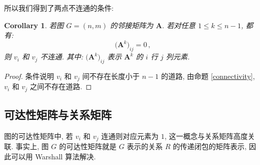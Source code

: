 \documentclass[UTF8]{ctexart}
\theoremstyle{mystyle}
\theoremstyle{myremark}
\theoremstyle{plain}
\newtheorem{corollary}{Corollary}[section]
\newcommand{\ve}[1]{\boldsymbol{\mathbf{#1}}}
\begin{document}
所以我们得到了两点不连通的条件:
\begin{corollary}
    若图 $ G = (n, m) $ 的邻接矩阵为 $ \ve A $. 若对任意 $ 1 \leqslant k \leqslant n - 1 $, 都有:
    \[ 
        \bigl( \ve A^k \bigr)_{ij} = 0 \,,
    \]
    则 $ v_i $ 和 $ v_j $ 不连通. 其中: $ \bigl( \ve A^k \bigr)_{ij} $ 表示 $ \ve A^k $ 的 $ i $ 行 $ j $ 列元素.
\end{corollary}

\begin{proof}
    条件说明 $ v_i $ 和 $ v_j $ 间不存在长度小于 $ n - 1 $ 的道路, 由命题 \ref{connectivity}, $ v_i $ 和 $ v_j $ 之间不存在道路.
\end{proof}


\subsection{可达性矩阵与关系矩阵}
图的可达性矩阵中, 若 $ v_i $ 和 $ v_j $ 连通则对应元素为 $ 1 $, 这一概念与关系矩阵高度关联. 事实上, 图 $ G $ 的可达性矩阵就是 $ G $ 表示的关系 $ R $ 的传递闭包的矩阵表示, 因此可以用 Warshall 算法解决.
\end{document}
